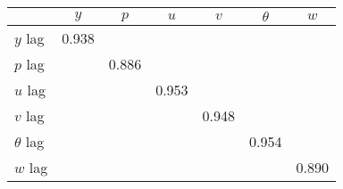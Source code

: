 \begin{tabular}{l*{6}{c}}
\toprule
                &\multicolumn{1}{c}{$ y $}&\multicolumn{1}{c}{$ p $}&\multicolumn{1}{c}{$ u $}&\multicolumn{1}{c}{$ v $}&\multicolumn{1}{c}{$ \theta $}&\multicolumn{1}{c}{$ w $}\\
\midrule
$ y $ lag       &    0.938&         &         &         &         &         \\
$ p $ lag       &         &    0.886&         &         &         &         \\
$ u $ lag       &         &         &    0.953&         &         &         \\
$ v $ lag       &         &         &         &    0.948&         &         \\
$ \theta $ lag  &         &         &         &         &    0.954&         \\
$ w $ lag       &         &         &         &         &         &    0.890\\
\bottomrule
\end{tabular}
